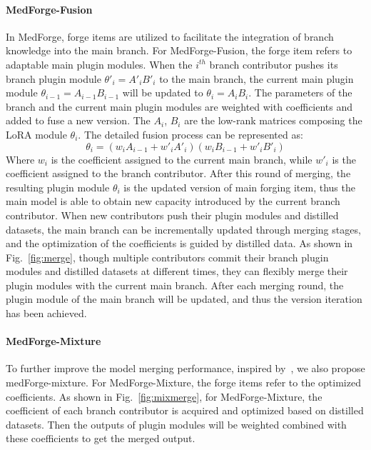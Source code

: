 \paragraph{MedForge-Fusion}
In MedForge, forge items are utilized to facilitate the integration of branch knowledge into the main branch.
For MedForge-Fusion, the forge item refers to adaptable main plugin modules. When the $i^{th}$ branch contributor pushes its branch plugin module $\theta'_i=A'_iB'_i$ to the main branch, the current main plugin module $\theta_{i-1}=A_{i-1}B_{i-1}$ will be updated to $\theta_{i}=A_{i}B_{i}$. The parameters of the branch and the current main plugin modules are weighted with coefficients and added to fuse a new version. The $A_i$, $B_i$ are the low-rank matrices composing the LoRA module $\theta_i$. The detailed fusion process can be represented as:
\begin{equation}
\theta_{i}=(w_i A_{i-1}+w'_i A'_i)(w_i B_{i-1}+ w'_i B'_i)
\end{equation}
Where $w_i$ is the coefficient assigned to the current main branch, while $w'_i$ is the coefficient assigned to the branch contributor. After this round of merging, the resulting plugin module $\theta_{i}$ is the updated version of main forging item, thus the main model is able to obtain new capacity introduced by the current branch contributor. When new contributors push their plugin modules and distilled datasets, the main branch can be incrementally updated through merging stages, and the optimization of the coefficients is guided by distilled data.
As shown in Fig.~\ref{fig:merge}, though multiple contributors commit their branch plugin modules and distilled datasets at different times, they can flexibly merge their plugin modules with the current main branch. After each merging round, the plugin module of the main branch will be updated, and thus the version iteration has been achieved.


\paragraph{MedForge-Mixture}
To further improve the model merging performance, inspired by~\cite{zhao2024loraretriever}, we also propose medForge-mixture. For MedForge-Mixture, the forge items refer to the optimized coefficients.
As shown in Fig.~\ref{fig:mixmerge}, for MedForge-Mixture, the coefficient of each branch contributor is acquired and optimized based on distilled datasets. Then the outputs of plugin modules will be weighted combined with these coefficients to get the merged output. 

